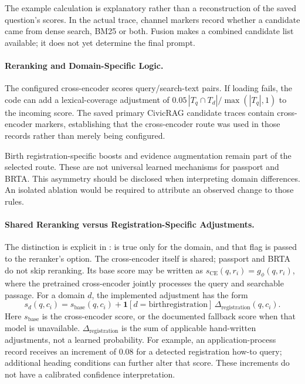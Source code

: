 The example calculation is explanatory rather than a reconstruction of the saved question's scores. In the actual trace, channel markers record whether a candidate came from dense search, BM25 or both. Fusion makes a combined candidate list available; it does not yet determine the final prompt.

\paragraph{Reranking and Domain-Specific Logic.}
The configured cross-encoder scores query/search-text pairs. If loading fails, the code can add a lexical-coverage adjustment of $0.05\,|T_q\cap T_d|/\max(|T_q|,1)$ to the incoming score. The saved primary CivicRAG candidate traces contain cross-encoder markers, establishing that the cross-encoder route was used in those records rather than merely being configured.

Birth registration-specific boosts and evidence augmentation remain part of the selected route. These are not universal learned mechanisms for passport and BRTA. This asymmetry should be disclosed when interpreting domain differences. An isolated ablation would be required to attribute an observed change to those rules.

\paragraph{Shared Reranking versus Registration-Specific Adjustments.}
The distinction is explicit in :  is true only for the  domain, and that flag is passed to the reranker's  option. The cross-encoder itself is shared; passport and BRTA do not skip reranking. Its base score may be written as $s_{\mathrm{CE}}(q,r_i)=g_\phi(q,r_i)$, where the pretrained cross-encoder jointly processes the query and searchable passage. For a domain $d$, the implemented adjustment has the form
\begin{equation}
s_d(q,c_i)=s_{\mathrm{base}}(q,c_i)+
\mathbf{1}[d=\mathrm{birth registration}]\,\Delta_{\mathrm{registration}}(q,c_i).
\end{equation}
Here $s_{\mathrm{base}}$ is the cross-encoder score, or the documented fallback score when that model is unavailable. $\Delta_{\mathrm{registration}}$ is the sum of applicable hand-written adjustments, not a learned probability. For example, an application-process record receives an increment of 0.08 for a detected registration how-to query; additional heading conditions can further alter that score. These increments do not have a calibrated confidence interpretation.

